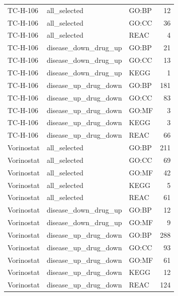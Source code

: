 \begin{longtable}{@{}lllr@{}}
TC-H-106 & all\_selected & GO:BP & 12 \\
TC-H-106 & all\_selected & GO:CC & 36 \\
TC-H-106 & all\_selected & REAC & 4 \\
TC-H-106 & disease\_down\_drug\_up & GO:BP & 21 \\
TC-H-106 & disease\_down\_drug\_up & GO:CC & 13 \\
TC-H-106 & disease\_down\_drug\_up & KEGG & 1 \\
TC-H-106 & disease\_up\_drug\_down & GO:BP & 181 \\
TC-H-106 & disease\_up\_drug\_down & GO:CC & 83 \\
TC-H-106 & disease\_up\_drug\_down & GO:MF & 3 \\
TC-H-106 & disease\_up\_drug\_down & KEGG & 3 \\
TC-H-106 & disease\_up\_drug\_down & REAC & 66 \\
Vorinostat & all\_selected & GO:BP & 211 \\
Vorinostat & all\_selected & GO:CC & 69 \\
Vorinostat & all\_selected & GO:MF & 42 \\
Vorinostat & all\_selected & KEGG & 5 \\
Vorinostat & all\_selected & REAC & 61 \\
Vorinostat & disease\_down\_drug\_up & GO:BP & 12 \\
Vorinostat & disease\_down\_drug\_up & GO:MF & 9 \\
Vorinostat & disease\_up\_drug\_down & GO:BP & 288 \\
Vorinostat & disease\_up\_drug\_down & GO:CC & 93 \\
Vorinostat & disease\_up\_drug\_down & GO:MF & 61 \\
Vorinostat & disease\_up\_drug\_down & KEGG & 12 \\
Vorinostat & disease\_up\_drug\_down & REAC & 124 \\
\end{longtable}
\endgroup
